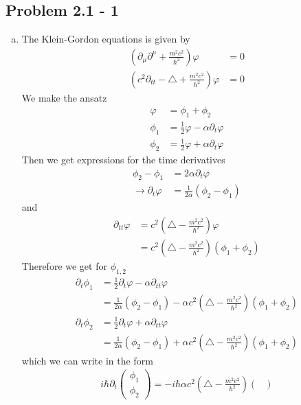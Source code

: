 \documentclass[../main.tex]{subfiles}
\begin{document}
\subsection{Problem 2.1 - 1}
\begin{enumerate}[(a)]
\item The Klein-Gordon equations is given by
\begin{align}
    \left(\partial_\mu\partial^\mu+\frac{m^2c^2}{\hbar^2}\right)\varphi&=0\\
    \left(c^2\partial_{tt}-\triangle+\frac{m^2c^2}{\hbar^2}\right)\varphi&=0
\end{align}
We make the ansatz
\begin{align}
    \varphi&=\phi_1+\phi_2\\
    \phi_1&=\frac{1}{2}\varphi-\alpha\partial_t\varphi\\
    \phi_2&=\frac{1}{2}\varphi+\alpha\partial_t\varphi
\end{align}
Then we get expressions for the time derivatives 
\begin{align}
    \phi_2-\phi_1&=2\alpha\partial_t\varphi\\
    \rightarrow\partial_t\varphi&=\frac{1}{2\alpha}(\phi_2-\phi_1)
\end{align}
and
\begin{align}
    \partial_{tt}\varphi&=c^2\left(\triangle-\frac{m^2c^2}{\hbar^2}\right)\varphi\\
    &=c^2\left(\triangle-\frac{m^2c^2}{\hbar^2}\right)(\phi_1+\phi_2)
\end{align}
Therefore we get for $\phi_{1,2}$
\begin{align}
    \partial_t\phi_1
    &=\frac{1}{2}\partial_t\varphi-\alpha\partial_{tt}\varphi\\
    &=\frac{1}{2\alpha}(\phi_2-\phi_1)-\alpha c^2\left(\triangle-\frac{m^2c^2}{\hbar^2}\right)(\phi_1+\phi_2)\\
    \partial_t\phi_2
    &=\frac{1}{2}\partial_t\varphi+\alpha\partial_{tt}\varphi\\
    &=\frac{1}{2\alpha}(\phi_2-\phi_1)+\alpha c^2\left(\triangle-\frac{m^2c^2}{\hbar^2}\right)(\phi_1+\phi_2)
\end{align}
which we can write in the form
\begin{align}
i\hbar\partial_t\begin{pmatrix}
\phi_1 \\
\phi_2 
\end{pmatrix}=-i\hbar\alpha c^2\left(\triangle-\frac{m^2c^2}{\hbar^2}\right)
\begin{pmatrix}

\end{pmatrix}
\end{align}
\end{enumerate}
\end{document}
